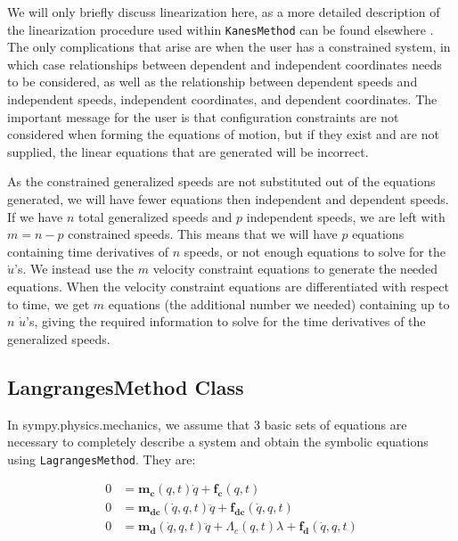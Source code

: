 \documentclass[twocolumn,10pt]{asme2e}
\begin{document}
We will only briefly discuss linearization here, as a more detailed description
of the linearization procedure used within \verb|KanesMethod| can be found
elsewhere \cite{Peterson2013}.  The only complications that arise are when the
user has a constrained system, in which case relationships between dependent
and independent coordinates needs to be considered, as well as the relationship
between dependent speeds and independent speeds, independent coordinates, and
dependent coordinates.  The important message for the user is that
configuration constraints are not considered when forming the equations of
motion, but if they exist and are not supplied, the linear equations that are
generated will be incorrect.

As the constrained generalized speeds are not substituted out of the equations
generated, we will have fewer equations then independent and dependent speeds.
If we have $n$ total generalized speeds and $p$ independent speeds, we are left
with $m=n-p$ constrained speeds.
This means that we will have $p$ equations containing time derivatives of $n$
speeds, or not enough equations to solve for the $\dot{u}$'s.
We instead use the $m$ velocity constraint equations to generate the needed
equations.
When the velocity constraint equations are differentiated with respect to time,
we get $m$ equations (the additional number we needed) containing up to $n$
$\dot{u}$'s, giving the required information to solve for the time derivatives
of the generalized speeds.
\subsection*{LangrangesMethod Class}
In sympy.physics.mechanics, we assume that 3 basic sets of equations are
necessary to completely describe a system and obtain the symbolic equations
using \verb|LagrangesMethod|. They are:

\begin{align}
    \label{eqn:lag_qd}
    0 &= \mathbf{m_{c}}(q, t) \dot{q} + \mathbf{f_{c}}(q, t)\\
    \label{eqn:lag_qdd}
    0 &= \mathbf{m_{dc}}(\dot{q}, q, t) \ddot{q} + \mathbf{f_{dc}}(\dot{q}, q,
        t)\\
    \label{eqn:lag_eom}
    0 &= \mathbf{m_d}(\dot{q}, q, t) \ddot{q} + \Lambda_c(q, t)
        \lambda + \mathbf{f_d}(\dot{q}, q, t)
\end{align}
\end{document}
